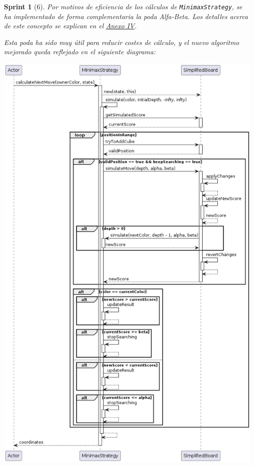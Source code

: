 \documentclass[12pt,a4paper,openright]{book}
\theoremstyle{break}
\newtheorem*{sprint}{Sprint}
\begin{document}
\begin{sprint}[6]
Por motivos de eficiencia de los cálculos de \texttt{MinimaxStrategy}, se ha implementado de forma complementaria la poda Alfa-Beta. Los detalles acerca de este concepto se explican en el \hyperref[ch:AnexoIV]{Anexo IV}.

Esta poda ha sido muy útil para reducir costes de cálculo, y el nuevo algoritmo mejorado queda reflejado en el siguiente diagrama:

\begin{center}
\centering
\includegraphics[scale=0.5]{MinimaxStrategy.calculateNextMove()-sprint6.png}
\end{center}

\end{sprint}
\end{document}
